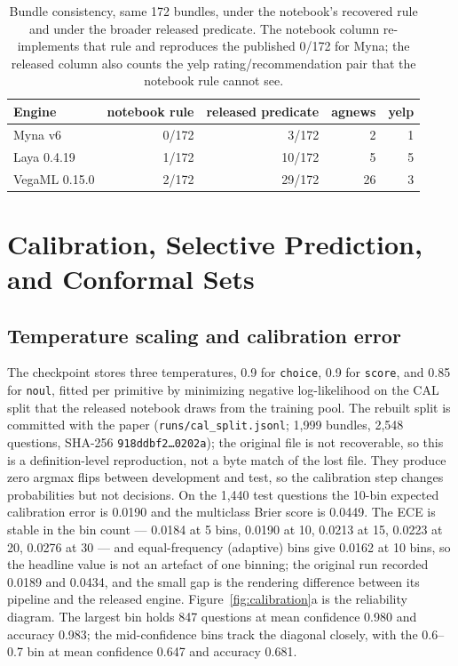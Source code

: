 \begin{table}[t]
\centering
\footnotesize
\caption{Bundle consistency, same 172 bundles, under the notebook's recovered rule and under the
broader released predicate. The notebook column re-implements that rule and reproduces the
published 0/172 for Myna; the released column also counts the yelp rating/recommendation pair that
the notebook rule cannot see.}
\label{tab:consistency}
\begin{tabular}{lrrrr}
\toprule
Engine & notebook rule & released predicate & agnews & yelp \\
\midrule
Myna v6 & 0/172 & 3/172 & 2 & 1 \\
Laya 0.4.19 & 1/172 & 10/172 & 5 & 5 \\
VegaML 0.15.0 & 2/172 & 29/172 & 26 & 3 \\
\bottomrule
\end{tabular}
\end{table}

\section{Calibration, Selective Prediction, and Conformal Sets}
\label{sec:calibration}

\subsection{Temperature scaling and calibration error}
The checkpoint stores three temperatures, 0.9 for \texttt{choice}, 0.9 for \texttt{score}, and
0.85 for \texttt{noul}, fitted per primitive by minimizing negative log-likelihood on the CAL split
that the released notebook draws from the training pool. The rebuilt split is committed
with the paper (\texttt{runs/cal\_split.jsonl}; 1{,}999 bundles, 2{,}548 questions,
SHA-256 \texttt{918ddbf2\ldots0202a}); the original file is not recoverable, so
this is a definition-level reproduction, not a byte match of the lost file. They produce zero argmax flips between
development and test, so the calibration step changes probabilities but not decisions. On the
1{,}440 test questions the 10-bin expected calibration error is 0.0190 and the multiclass Brier
score is 0.0449. The ECE is stable in the bin count --- 0.0184 at 5 bins, 0.0190 at 10, 0.0213 at
15, 0.0223 at 20, 0.0276 at 30 --- and equal-frequency (adaptive) bins give 0.0162 at 10 bins, so
the headline value is not an artefact of one binning; the original run recorded 0.0189 and 0.0434, and the small gap is the rendering
difference between its pipeline and the released engine. Figure~\ref{fig:calibration}a is the
reliability diagram. The largest bin holds 847 questions at mean confidence 0.980 and accuracy
0.983; the mid-confidence bins track the diagonal closely, with the 0.6--0.7 bin at mean
confidence 0.647 and accuracy 0.681.

